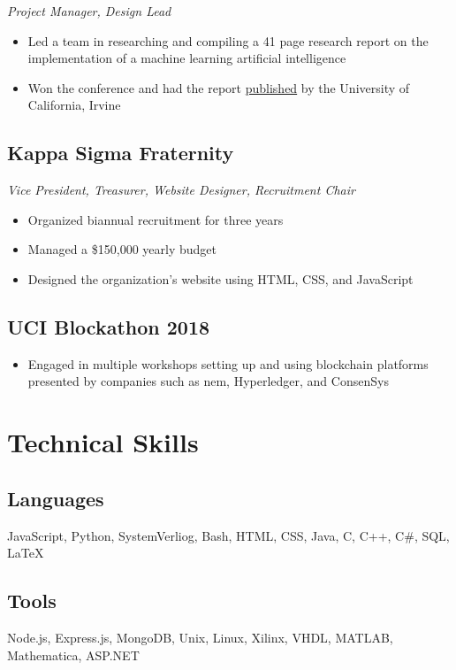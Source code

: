 \documentclass[10pt]{article}
\begin{document}
\noindent\textit{Project Manager, Design Lead}

\begin{itemize}
	\setlength\itemsep{0em}
	\item Led a team in researching and compiling a 41 page research report on the implementation of a machine learning artificial intelligence
	\item Won the conference and had the report \href{https://escholarship.org/uc/item/3hm5q8b8}{published} by the University of California, Irvine
\end{itemize}

\subsection{Kappa Sigma Fraternity}

\noindent\textit{Vice President, Treasurer, Website Designer, Recruitment Chair}

\begin{itemize}
	\setlength\itemsep{0em}
	\item Organized biannual recruitment for three years
	\item Managed a \$150,000 yearly budget
	\item Designed the organization's website using HTML, CSS, and JavaScript
\end{itemize}

\subsection{UCI Blockathon 2018}

\begin{itemize}
	\setlength\itemsep{0em}
	\item Engaged in multiple workshops setting up and using blockchain platforms presented by companies such as nem, 
Hyperledger, and ConsenSys
\end{itemize}

\section{Technical Skills}

\subsection{Languages}

JavaScript, Python, SystemVerliog, Bash, HTML, CSS, Java, C, C++, C\#, SQL, \LaTeX

\subsection{Tools}

Node.js, Express.js, MongoDB, Unix, Linux, Xilinx, VHDL, MATLAB, Mathematica, ASP.NET
\end{document}

